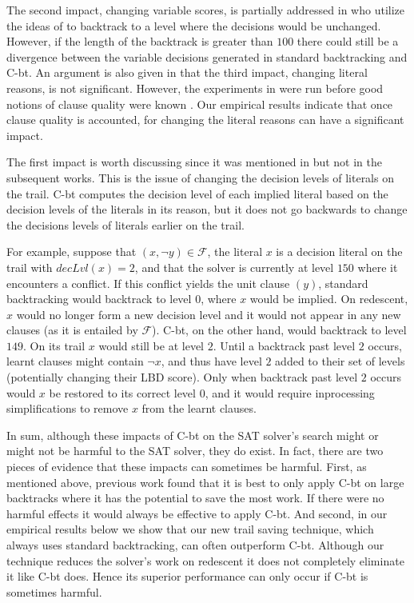 \documentclass[runningheads]{llncs}
\newcommand{\sat}{SAT\xspace}
\newcommand{\dlevel}[1]{\ensuremath{\mathit{decLvl}(#1)}}
\newcommand{\formula}{\ensuremath{\mathcal{F}}}
\newcommand{\cbt}{C-bt\xspace}
\begin{document}
The second impact, changing variable scores, is partially addressed in
\cite{DBLP:conf/sat/MohleB19} who utilize the ideas of
\cite{DBLP:journals/jsat/TakRH11} to backtrack to a level where the
decisions would be unchanged. However, if the length of the backtrack
is greater than $100$ there could still be a divergence between the
variable decisions generated in standard backtracking and \cbt. An
argument is also given in \cite{DBLP:journals/jsat/TakRH11} that the
third impact, changing literal reasons, is not significant. However,
the experiments in \cite{DBLP:journals/jsat/TakRH11} were run before
good notions of clause quality were known
\cite{DBLP:conf/ijcai/AudemardS09}. Our empirical results indicate
that once clause quality is accounted, for changing the literal
reasons can have a significant impact.

The first impact is worth discussing since it was mentioned in
\cite{DBLP:conf/lpar/JiangZ13} but not in the subsequent works. This
is the issue of changing the decision levels of literals on the
trail. \cbt computes the decision level of each implied literal based
on the decision levels of the literals in its reason, but it does not
go backwards to change the decisions levels of literals earlier on the
trail.

\begin{example}
    For example, suppose that $(x, \lnot y)\in \formula$, the literal $x$
    is a decision literal on the trail with $\dlevel{x}=2$, and that
    the solver is currently at level $150$ where it encounters a
    conflict. If this conflict yields the unit clause $(y)$, standard
    backtracking would backtrack to level $0$, where $x$ would be
    implied. On redescent, $x$ would no longer form a new decision
    level and it would not appear in any new clauses (as it is
    entailed by $\formula$). \cbt, on the other hand, would backtrack
    to level $149$. On its trail $x$ would still be at level
    $2$. Until a backtrack past level $2$ occurs, learnt clauses might
    contain $\lnot x$, and thus have level $2$ added to their set of
    levels (potentially changing their LBD score). Only when backtrack
    past level $2$ occurs would $x$ be restored to its correct level
    $0$, and it would require inprocessing simplifications to remove $x$
    from the learnt clauses.
\end{example}

In sum, although these impacts of \cbt on the \sat solver's search
might or might not be harmful to the \sat solver, they do exist. In
fact, there are two pieces of evidence that these impacts can
sometimes be harmful. First, as mentioned above, previous work found
that it is best to only apply \cbt on large backtracks where it has
the potential to save the most work. If there were no harmful effects
it would always be effective to apply \cbt. And second, in our
empirical results below we show that our new trail saving technique,
which always uses standard backtracking, can often outperform
\cbt. Although our technique reduces the solver's work on redescent it
does not completely eliminate it like \cbt does. Hence its superior
performance can only occur if \cbt is sometimes harmful.
\end{document}
